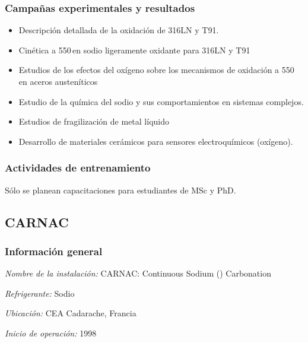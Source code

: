 \documentclass{article}
\begin{document}
\subsubsection*{Campañas experimentales y resultados}
\begin{itemize}
    \item Descripción detallada de la oxidación de 316LN y T91.
    \item Cinética a 550\celsius\,en sodio ligeramente oxidante para 316LN y T91
    \item Estudios de los efectos del oxígeno sobre los mecanismos de oxidación a 550\celsius\,en aceros austeníticos
    \item Estudio de la química del sodio y sus comportamientos en sistemas complejos.
    \item Estudios de fragilización de metal líquido
    \item Desarrollo de materiales cerámicos para sensores electroquímicos (oxígeno).
\end{itemize}

\subsubsection*{Actividades de entrenamiento}
Sólo se planean capacitaciones para estudiantes de MSc y PhD.
\subsection{CARNAC}
\subsubsection*{Información general}
\textit{Nombre de la instalación: }CARNAC: Continuous Sodium () Carbonation

\textit{Refrigerante: }Sodio

\textit{Ubicación: }CEA Cadarache, Francia

\textit{Inicio de operación: }1998
\end{document}
